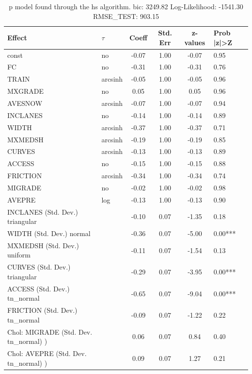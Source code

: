 \begin{table}
	\caption{p model found through the hs algorithm. bic: 3249.82 Log-Likelihood: -1541.30 RMSE_TEST: 903.15}
	\begin{center}
		\begin{tabular}{|l|l|c|c|c|l|}
			\hline
			Effect & $\tau$ & Coeff & Std. Err & z-values & Prob |z|>Z \\
			\hline
			const & no & -0.07 & 1.00 & -0.07 & 0.95 \\
			\hline
			FC & no & -0.31 & 1.00 & -0.31 & 0.76 \\
			\hline
			TRAIN & arcsinh & -0.05 & 1.00 & -0.05 & 0.96 \\
			\hline
			MXGRADE & no & 0.05 & 1.00 & 0.05 & 0.96 \\
			\hline
			AVESNOW & arcsinh & -0.07 & 1.00 & -0.07 & 0.94 \\
			\hline
			INCLANES & no & -0.14 & 1.00 & -0.14 & 0.89 \\
			\hline
			WIDTH & arcsinh & -0.37 & 1.00 & -0.37 & 0.71 \\
			\hline
			MXMEDSH & arcsinh & -0.19 & 1.00 & -0.19 & 0.85 \\
			\hline
			CURVES & arcsinh & -0.13 & 1.00 & -0.13 & 0.89 \\
			\hline
			ACCESS & no & -0.15 & 1.00 & -0.15 & 0.88 \\
			\hline
			FRICTION & arcsinh & -0.34 & 1.00 & -0.34 & 0.74 \\
			\hline
			MIGRADE & no & -0.02 & 1.00 & -0.02 & 0.98 \\
			\hline
			AVEPRE & log & -0.13 & 1.00 & -0.13 & 0.90 \\
			\hline
			INCLANES (Std. Dev.) triangular &  & -0.10 & 0.07 & -1.35 & 0.18 \\
			\hline
			WIDTH (Std. Dev.) normal &  & -0.36 & 0.07 & -5.00 & 0.00*** \\
			\hline
			MXMEDSH (Std. Dev.) uniform &  & -0.11 & 0.07 & -1.54 & 0.13 \\
			\hline
			CURVES (Std. Dev.) triangular &  & -0.29 & 0.07 & -3.95 & 0.00*** \\
			\hline
			ACCESS (Std. Dev.) tn_normal &  & -0.65 & 0.07 & -9.04 & 0.00*** \\
			\hline
			FRICTION (Std. Dev.) tn_normal &  & -0.09 & 0.07 & -1.22 & 0.22 \\
			\hline
			 Chol: MIGRADE (Std. Dev. tn_normal) ) &  & 0.06 & 0.07 & 0.84 & 0.40 \\
			\hline
			 Chol: AVEPRE (Std. Dev. tn_normal) ) &  & 0.09 & 0.07 & 1.27 & 0.21 \\

\end{tabular}
\end{center}
\end{table}

